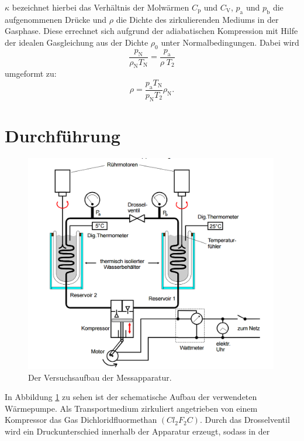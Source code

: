 \documentclass[
  bibliography=totoc,     %
  captions=tableheading,  %
  titlepage=firstiscover, %
]{scrartcl}
\begin{document}
$\kappa$ bezeichnet hierbei das Verhältnis der Molwärmen $C_{\mathup{p}}$ und
$C_{\mathup{V}}$, $p_{\mathup{a}}$ und $p_{\mathup{b}}$ die aufgenommenen Drücke
und $\rho$ die Dichte des zirkulierenden Mediums in der Gasphase. Diese errechnet
sich aufgrund der adiabatischen Kompression mit Hilfe der idealen Gasgleichung
aus der Dichte $\rho_0$ unter Normalbedingungen. Dabei wird
\begin{equation}
    \frac{p_{\mathup{N}}}{ρ_{\mathup{N}}T_{\mathup{N}}}=\frac{p_{\mathup{a}}}{ρ\;T_{\mathup{2}}}
\end{equation}
umgeformt zu:
\begin{equation}
    ρ=\frac{p_{\mathup{a}}T_{\mathup{N}}}{p_{\mathup{N}}T_{\mathup{2}}}ρ_{\mathup{N}}.
	\label{eq:dichte}
\end{equation}
\section{Durchführung}
\label{sec:durchführung}
\begin{figure}[htb]
  \centering
  \includegraphics[width=0.99\textwidth]{V2062.png}
  \caption{Der Versuchsaufbau der Messapparatur.}
  \label{fig:V2062}
\end{figure}
In Abbildung \ref{fig:V2062} zu sehen ist der schematische Aufbau der
verwendeten Wärmepumpe. Als Transportmedium zirkuliert angetrieben von einem
Kompressor das Gas Dichloridfluormethan $(Cl_2F_2C)$. Durch das Drosselventil
wird ein Druckunterschied innerhalb der Apparatur erzeugt, sodass in der
\end{document}
